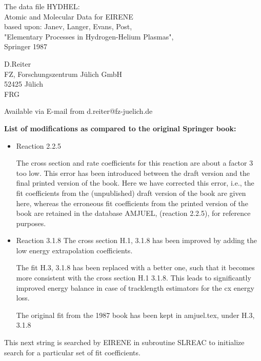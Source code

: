 \documentclass[12pt]{article}
\begin{document}
\parindent 0pt
{\LARGE \bf \center
\vspace*{3truecm}

The data file HYDHEL: \\
Atomic and Molecular Data for EIRENE \\
based upon: Janev, Langer, Evans, Post, \\
"Elementary
Processes in Hydrogen-Helium Plasmas", \\
Springer 1987
\vspace*{3truecm}

D.Reiter \\
FZ, Forschungszentrum J\"ulich GmbH \\
52425 J\"ulich \\
FRG
\vspace{5truecm}


Available via E-mail from d.reiter@fz-juelich.de
}

\newpage
\tableofcontents
\newpage
{\bf List of modifications as compared to the original Springer book:}
\begin{itemize}
\item{Reaction 2.2.5}

The cross section and rate coefficients for this reaction are about a
factor 3 too low. This error has been introduced between the draft version and
the final printed version of the book. Here we have corrected this error,
i.e., the fit coefficients from the (unpublished) draft version of the book are
given here, whereas the erroneous fit coefficients from the printed version
of the book are retained in the database AMJUEL, (reaction 2.2.5), for reference
purposes.
\item{Reaction 3.1.8}
The cross section H.1, 3.1.8 has been improved by adding
the low energy extrapolation coefficients.

The fit H.3, 3.1.8 has been replaced with a better one, such that
it becomes more consistent with the cross section H.1 3.1.8.
This leads to significantly improved energy balance in case of
tracklength estimators for the cx energy loss.

The original fit from the 1987 book has been kept in amjuel.tex,
under H.3, 3.1.8
\end{itemize}
\newpage

This next string is searched by EIRENE in subroutine SLREAC
to initialize search for a particular set of fit coefficients.
\end{document}

